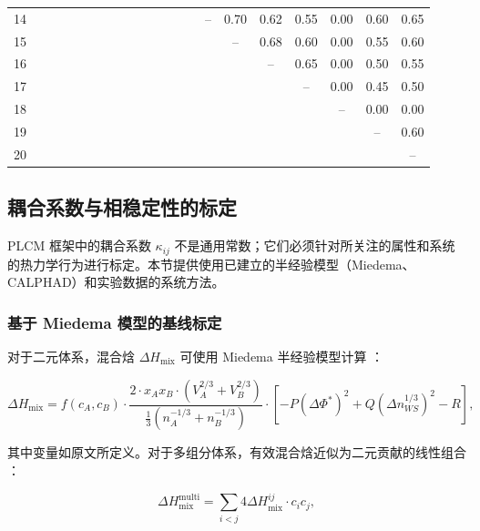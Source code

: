 \documentclass[12pt,a4paper]{article}
\begin{document}
{\begin{longtable}{c|*{20}{c}}
			14 &   &   &   &   &   &   &   &   &   &   &   &   &   & – & 0.70 & 0.62 & 0.55 & 0.00 & 0.60 & 0.65 \\
			15 &   &   &   &   &   &   &   &   &   &   &   &   &   &   & – & 0.68 & 0.60 & 0.00 & 0.55 & 0.60 \\
			16 &   &   &   &   &   &   &   &   &   &   &   &   &   &   &   & – & 0.65 & 0.00 & 0.50 & 0.55 \\
			17 &   &   &   &   &   &   &   &   &   &   &   &   &   &   &   &   & – & 0.00 & 0.45 & 0.50 \\
			18 &   &   &   &   &   &   &   &   &   &   &   &   &   &   &   &   &   & – & 0.00 & 0.00 \\
			19 &   &   &   &   &   &   &   &   &   &   &   &   &   &   &   &   &   &   & – & 0.60 \\
			20 &   &   &   &   &   &   &   &   &   &   &   &   &   &   &   &   &   &   &   & – \\
			\bottomrule
	\end{longtable}}
	
	\subsection{耦合系数与相稳定性的标定}
	\label{subsec:calibration}
	
	PLCM 框架中的耦合系数 \(\kappa_{ij}\) 不是通用常数；它们必须针对所关注的属性和系统的热力学行为进行标定。本节提供使用已建立的半经验模型（Miedema、CALPHAD）和实验数据的系统方法。
	
	\subsubsection{基于 Miedema 模型的基线标定}
	
	对于二元体系，混合焓 \(\Delta H_{\text{mix}}\) 可使用 Miedema 半经验模型计算 \cite{Miedema1980, Takeuchi2010}：
	
	\begin{equation}
		\Delta H_{\text{mix}} = f(c_A, c_B) \cdot \frac{2 \cdot x_A x_B \cdot (V_A^{2/3} + V_B^{2/3})}{\frac{1}{3}(n_A^{-1/3} + n_B^{-1/3})}
		\cdot \left[ -P (\Delta \Phi^*)^2 + Q (\Delta n_{WS}^{1/3})^2 - R \right],
		\label{eq:miedema}
	\end{equation}
	
	其中变量如原文所定义。对于多组分体系，有效混合焓近似为二元贡献的线性组合 \cite{Takeuchi2010}：
	
	\begin{equation}
		\Delta H_{\text{mix}}^{\text{multi}} = \sum_{i<j} 4 \Delta H_{\text{mix}}^{ij} \cdot c_i c_j,
		\label{eq:multicomponent}
	\end{equation}
	
\end{document}
